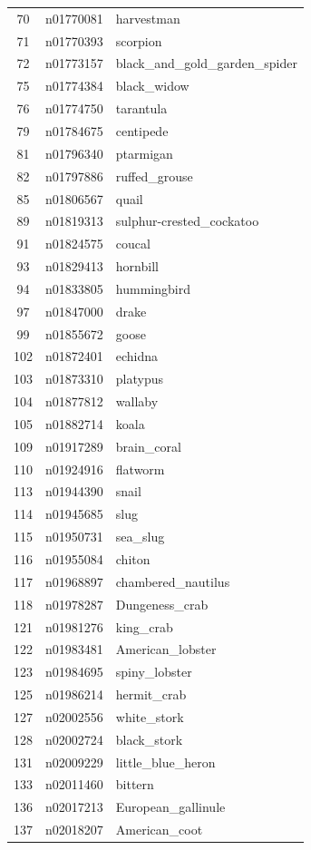 \begin{table}
\begin{tabular}{cll}
70 & n01770081 & harvestman \\
71 & n01770393 & scorpion \\
72 & n01773157 & black_and_gold_garden_spider \\
75 & n01774384 & black_widow \\
76 & n01774750 & tarantula \\
79 & n01784675 & centipede \\
81 & n01796340 & ptarmigan \\
82 & n01797886 & ruffed_grouse \\
85 & n01806567 & quail \\
89 & n01819313 & sulphur-crested_cockatoo \\
91 & n01824575 & coucal \\
93 & n01829413 & hornbill \\
94 & n01833805 & hummingbird \\
97 & n01847000 & drake \\
99 & n01855672 & goose \\
102 & n01872401 & echidna \\
103 & n01873310 & platypus \\
104 & n01877812 & wallaby \\
105 & n01882714 & koala \\
109 & n01917289 & brain_coral \\
110 & n01924916 & flatworm \\
113 & n01944390 & snail \\
114 & n01945685 & slug \\
115 & n01950731 & sea_slug \\
116 & n01955084 & chiton \\
117 & n01968897 & chambered_nautilus \\
118 & n01978287 & Dungeness_crab \\
121 & n01981276 & king_crab \\
122 & n01983481 & American_lobster \\
123 & n01984695 & spiny_lobster \\
125 & n01986214 & hermit_crab \\
127 & n02002556 & white_stork \\
128 & n02002724 & black_stork \\
131 & n02009229 & little_blue_heron \\
133 & n02011460 & bittern \\
136 & n02017213 & European_gallinule \\
137 & n02018207 & American_coot \\

\end{tabular}
\end{table}
